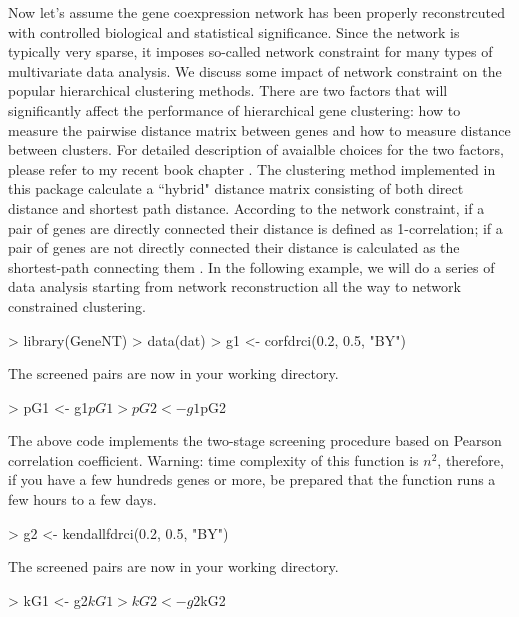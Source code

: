\documentclass[a4paper]{article}
\begin{document}
Now let's assume the gene coexpression network has been properly reconstrcuted with
controlled biological and statistical significance. Since the network is typically
very sparse, it imposes so-called network constraint for many types of multivariate
data analysis. We discuss some impact of network constraint on the popular hierarchical
clustering methods. There are two factors that will significantly affect the performance
of hierarchical gene clustering: how to measure the pairwise distance matrix between 
genes and how to measure distance between clusters. For detailed description of 
avaialble choices for the two factors, please refer to my recent book chapter \cite{Zhu07}. 
The clustering method implemented in this package calculate a ``hybrid" distance 
matrix consisting of both direct distance and shortest path distance. According 
to the network constraint, if a pair of genes are directly connected their distance 
is defined as 1-correlation; if a pair of genes are not directly connected their 
distance is calculated as the shortest-path connecting them \cite{Zhu05b}. In the 
following example, we will do a series of data analysis starting from network 
reconstruction all the way to network constrained clustering.   
\begin{Schunk}
\begin{Sinput}
> library(GeneNT)
> data(dat)
> g1 <- corfdrci(0.2, 0.5, "BY")
\end{Sinput}
\begin{Soutput}
The screened pairs are now in your working directory. 
\end{Soutput}
\begin{Sinput}
> pG1 <- g1$pG1
> pG2 <- g1$pG2
\end{Sinput}
\end{Schunk}
The above code implements the two-stage screening procedure based on Pearson
correlation coefficient. Warning: time complexity of this function is $n^2$,
therefore, if you have a few hundreds genes or more, be prepared that the function
runs a few hours to a few days. 
\begin{Schunk}
\begin{Sinput}
> g2 <- kendallfdrci(0.2, 0.5, "BY")
\end{Sinput}
\begin{Soutput}
The screened pairs are now in your working directory. 
\end{Soutput}
\begin{Sinput}
> kG1 <- g2$kG1
> kG2 <- g2$kG2
\end{Sinput}
\end{Schunk}
\end{document}
